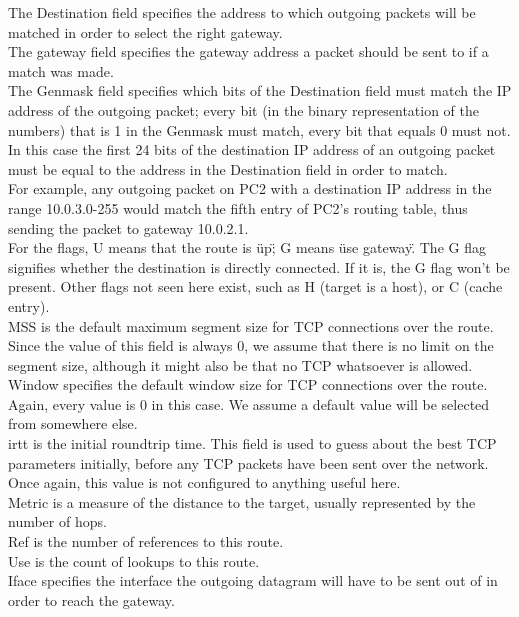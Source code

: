 The Destination field specifies the address to which outgoing packets will be matched in order to select the right gateway. \\
The gateway field specifies the gateway address a packet should be sent to if a match was made. \\
The Genmask field specifies which bits of the Destination field must match the IP address of the outgoing packet; every bit (in the binary representation of the numbers) that is 1 in the Genmask must match, every bit that equals 0 must not. In this case the first 24 bits of the destination IP address of an outgoing packet must be equal to the address in the Destination field in order to match. \\
For example, any outgoing packet on PC2 with a destination IP address in the range 10.0.3.0-255 would match the fifth entry of PC2's routing table, thus sending the packet to gateway 10.0.2.1. \\
For the flags, U means that the route is \"up\"; G means \"use gateway\". The G flag signifies whether the destination is directly connected. If it is, the G flag won't be present. Other flags not seen here exist, such as H (target is a host), or C (cache entry). \\
MSS is the default maximum segment size for TCP connections over the route. Since the value of this field is always 0, we assume that there is no limit on the segment size, although it might also be that no TCP whatsoever is allowed. \\
Window specifies the default window size for TCP connections over the route. Again, every value is 0 in this case. We assume a default value will be selected from somewhere else. \\
irtt is the initial roundtrip time. This field is used to guess about the best TCP parameters initially, before any TCP packets have been sent over the network. Once again, this value is not configured to anything useful here. \\
Metric is a measure of the distance to the target, usually represented by the number of hops. \\
Ref is the number of references to this route. \\
Use is the count of lookups to this route. \\
Iface specifies the interface the outgoing datagram will have to be sent out of in order to reach the gateway.